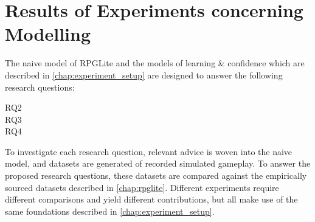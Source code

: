 \chapter{Results of Experiments concerning \AspectOriented Modelling}
\label{chap:exp2_old_aspects_new_systems}
\label{chap:experimental_results}
\label{sec:optimisation_with_aspects_experimental_results}



The naive model of RPGLite and the \aspectoriented models of learning \&
confidence which are described in \cref{chap:experiment_setup} are designed to
answer the following research questions:

\begin{researchquestion}
  \begin{description}
\item[RQ2] \rqtwo{}
\item[RQ3] \rqthree{}
\item[RQ4] \rqfour{}
  \end{description}
\end{researchquestion}


To investigate each research question, relevant advice is woven into the naive
model, and datasets are generated of recorded simulated gameplay. To answer the
proposed research questions, these datasets are compared against the empirically
sourced datasets described in \cref{chap:rpglite}. Different experiments require
different comparisons and yield different contributions, but all make use of the
same foundations described in \cref{chap:experiment_setup}.

